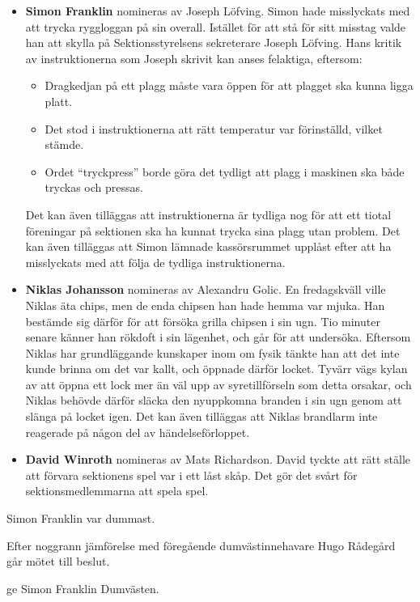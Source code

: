 \documentclass[hidelinks]{sektionsmote}
\begin{document}
\begin{itemize}
  \item \textbf{Simon Franklin} nomineras av Joseph Löfving.\newline
  Simon hade misslyckats med att trycka ryggloggan på sin overall.
  Istället för att stå för sitt misstag valde han att skylla på Sektionsstyrelsens sekreterare Joseph Löfving.
  Hans kritik av instruktionerna som Joseph skrivit kan anses felaktiga, eftersom:
  \begin{itemize}
    \item Dragkedjan på ett plagg måste vara öppen för att plagget ska kunna ligga platt.
    \item Det stod i instruktionerna att rätt temperatur var förinställd, vilket stämde.
    \item Ordet \enquote{tryckpress} borde göra det tydligt att plagg i maskinen ska både tryckas och pressas.
  \end{itemize}
  Det kan även tilläggas att instruktionerna är tydliga nog för att ett tiotal föreningar på sektionen ska ha kunnat trycka sina plagg utan problem.
  Det kan även tilläggas att Simon lämnade kassörsrummet upplåst efter att ha misslyckats med att följa de tydliga instruktionerna.

  \item \textbf{Niklas Johansson} nomineras av Alexandru Golic.\newline
  En fredagskväll ville Niklas äta chips, men de enda chipsen han hade hemma var mjuka.
  Han bestämde sig därför för att försöka grilla chipsen i sin ugn.
  Tio minuter senare känner han rökdoft i sin lägenhet, och går för att undersöka.
  Eftersom Niklas har grundläggande kunskaper inom om fysik tänkte han att det inte kunde brinna om det var kallt, och öppnade därför locket.
  Tyvärr vägs kylan av att öppna ett lock mer än väl upp av syretillförseln som detta orsakar, och Niklas behövde därför släcka den nyuppkomna branden i sin ugn genom att slänga på locket igen.
  Det kan även tilläggas att Niklas brandlarm inte reagerade på någon del av händelseförloppet.

  \item \textbf{David Winroth} nomineras av Mats Richardson.\newline
  David tyckte att rätt ställe att förvara sektionens spel var i ett låst skåp.
  Det gör det svårt för sektionsmedlemmarna att spela spel.

\end{itemize}

\begin{beslut}
  \item Simon Franklin var dummast.
\end{beslut}
Efter noggrann jämförelse med föregående dumvästinnehavare Hugo Rådegård går mötet till beslut.
\begin{beslut}
  \item ge Simon Franklin Dumvästen.
\end{beslut}
\end{document}

